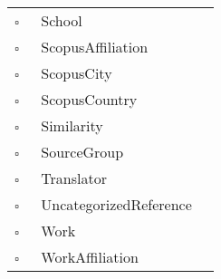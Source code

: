 \begin{longtable}{llp{8cm}}
$\square$\ & School &  \\
$\square$\ & ScopusAffiliation &  \\
$\square$\ & ScopusCity &  \\
$\square$\ & ScopusCountry &  \\
$\square$\ & Similarity &  \\
$\square$\ & SourceGroup &  \\
$\square$\ & Translator &  \\
$\square$\ & UncategorizedReference &  \\
$\square$\ & Work &  \\
$\square$\ & WorkAffiliation &  \\
\end{longtable}
